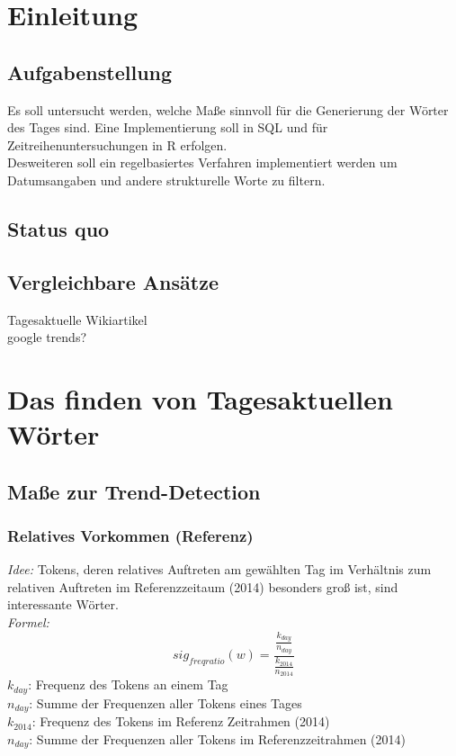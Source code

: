 


\ourtitlepage 
\tableofcontents
{} %
\clearpage
{} %
\chapter{Einleitung}
\section{Aufgabenstellung}
Es soll untersucht werden, welche Maße sinnvoll für die Generierung der Wörter des Tages sind. Eine Implementierung soll in SQL und für Zeitreihenuntersuchungen in R erfolgen.\\
Desweiteren soll ein regelbasiertes Verfahren implementiert werden um Datumsangaben und andere strukturelle Worte zu filtern.\\
\section{Status quo}
\section{Vergleichbare Ansätze}
Tagesaktuelle Wikiartikel\\
google trends?\\


\chapter{Das finden von Tagesaktuellen Wörter}
\section{Maße zur Trend-Detection}
\subsection{Relatives Vorkommen (Referenz)}
\emph{Idee: } Tokens, deren relatives Auftreten am gewählten Tag im Verhältnis zum relativen Auftreten im Referenzzeitaum (2014) besonders groß ist, sind interessante Wörter.\\ 
	\emph{Formel: } 
	\begin{equation}
	sig_{freqratio}(w) = \frac{\frac{k_{day}}{n_{day}}}{\frac{k_{2014}}{n_{2014}}}
	\end{equation}
	$k_{day}$: Frequenz des Tokens an einem Tag\\
	$n_{day}$: Summe der Frequenzen aller Tokens eines Tages\\
	$k_{2014}$: Frequenz des Tokens im Referenz Zeitrahmen (2014)\\
	$n_{day}$: Summe der Frequenzen aller Tokens im Referenzzeitrahmen (2014)\\
